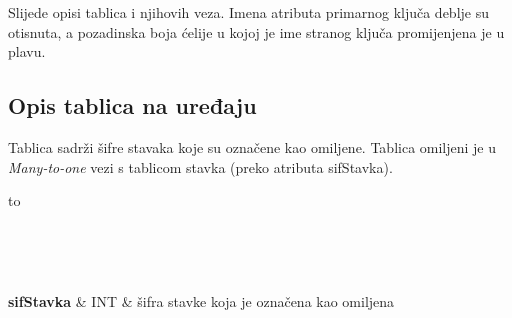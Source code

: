		Slijede opisi tablica i njihovih veza. Imena atributa primarnog ključa deblje su otisnuta, a pozadinska boja ćelije u kojoj je ime stranog ključa promijenjena je u plavu.
			
			
		

            \subsection{Opis tablica na uređaju}

                Tablica  sadrži šifre stavaka koje su označene kao omiljene. Tablica omiljeni je u \textit{Many-to-one} vezi s tablicom stavka (preko atributa sifStavka).
                \begin{longtabu} to \textwidth {|X[6, l]|X[6, l]|X[20, l]|}
                    
                    \hline {}     \\[3pt] \hline
                    \endfirsthead
                    
                    \hline {}     \\[3pt] \hline
                    \endhead
                    
                    \hline 
                    \endlastfoot

                     \textbf{sifStavka} & INT & šifra stavke koja je označena kao omiljena \\ \hline
                    
                    
                    
                \end{longtabu}

